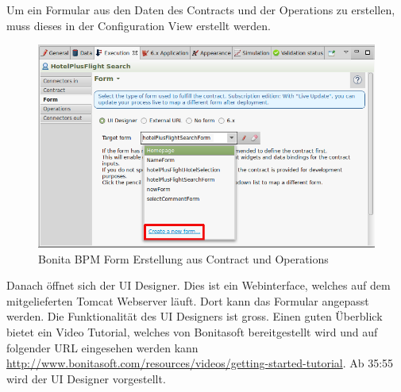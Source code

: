 Um ein Formular aus den Daten des Contracts und der Operations zu erstellen, muss dieses in der Configuration View erstellt werden.
\begin{figure}[H]
	\centering
	\includegraphics[width=1\textwidth]{images/bonita-forms-create.png}
	\caption{Bonita BPM Form Erstellung aus Contract und Operations}
	\label{fig:analyse:bonita:forms:forms:creation}
\end{figure}

Danach öffnet sich der UI Designer. Dies ist ein Webinterface, welches auf dem mitgelieferten Tomcat Webserver läuft. Dort kann das Formular angepasst werden.
Die Funktionalität des UI Designers ist gross. Einen guten Überblick bietet ein Video Tutorial, welches von Bonitasoft bereitgestellt wird und auf folgender URL eingesehen werden kann \url{http://www.bonitasoft.com/resources/videos/getting-started-tutorial}. Ab 35:55 wird der UI Designer vorgestellt.